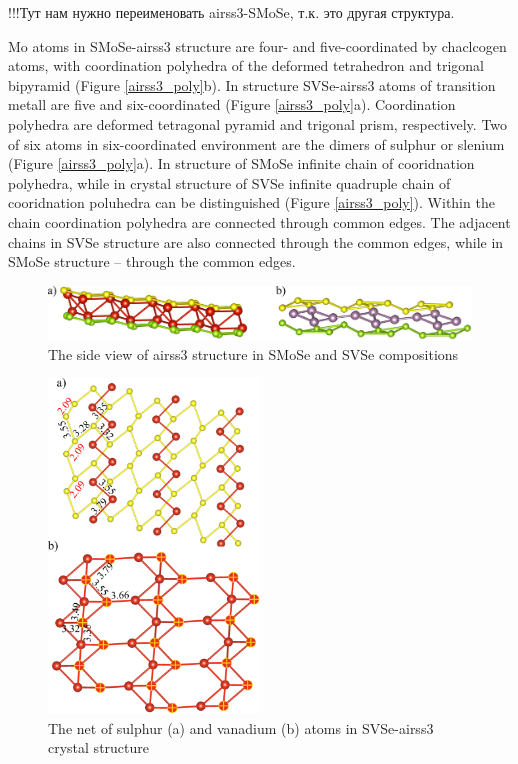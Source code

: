 \documentclass[a4paperm]{article}
\begin{document}
!!!Тут нам нужно переименовать airss3-SMoSe, т.к. это другая структура.


Mo atoms in SMoSe-airss3 structure are four- and five-coordinated by chaclcogen atoms, with coordination polyhedra of the deformed tetrahedron and trigonal bipyramid (Figure \ref{airss3_poly}b).
In structure SVSe-airss3 atoms of transition metall are five and six-coordinated (Figure \ref{airss3_poly}a).
Coordination polyhedra are  deformed tetragonal pyramid and trigonal prism, respectively.
Two of six atoms in six-coordinated environment are the dimers of sulphur or slenium (Figure \ref{airss3_poly}a).
In structure of SMoSe infinite chain of cooridnation polyhedra, while in crystal structure of SVSe infinite quadruple chain of cooridnation poluhedra can be distinguished (Figure \ref{airss3_poly}).
Within the chain coordination polyhedra are connected through common edges.
The adjacent chains in SVSe structure are also connected through the common edges, while in SMoSe structure – through the common edges.

\begin{figure}[H]
	\includegraphics[width=\textwidth]{airss3_side.png}
	\caption{The side view of airss3 structure in SMoSe and SVSe compositions}
	\label{airss3_side}
\end{figure}

\begin{figure}[H]
	\includegraphics[width=0.5\textwidth]{airss3_svse.png}
	\caption{The net of sulphur (a) and vanadium (b) atoms in SVSe-airss3 crystal structure}
	\label{airss3_svse}
\end{figure}
\end{document}
